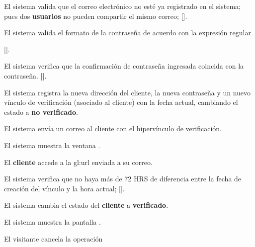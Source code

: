{\begin{trayectoriaPrincipal}
    \item El sistema valida que el correo electrónico no esté ya
      registrado en el sistema; pues dos \textbf{usuarios} no pueden
      compartir el mismo correo;
      [].

    \item El sistema valida el formato de la contraseña de acuerdo con
      la expresión regular


      [].

    \item El sistema verifica que la confirmación de contraseña
      ingresada coincida con la contraseña.
      [].

    \item El sistema registra la nueva dirección del cliente, la nueva
      contraseña y un nuevo vínculo de verificación (asociado al cliente) con
      la fecha actual, cambiando el estado a \textbf{no verificado}.

    \item El sistema envía un correo al cliente con el hipervínculo de
      verificación.

    \item El sistema muestra la ventana
      .

    \item El \textbf{cliente} accede a la \gls{gl:url} enviada a su
      correo.

    \item El sistema verifica que no haya más de 72 HRS de diferencia
      entre la fecha de creación del vínculo y la hora actual;
      [].

    \item El sistema cambia el estado del \textbf{cliente} a
      \textbf{verificado}.

    \item El sistema muestra la pantalla .

  \end{trayectoriaPrincipal}


  \begin{trayectoriaAlternativa}
    {El visitante cancela la operación}


\end{trayectoriaAlternativa}}
